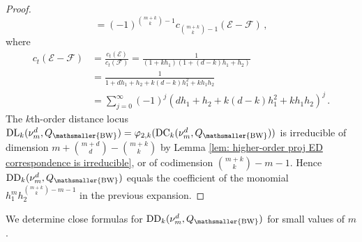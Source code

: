 \documentclass[11pt,reqno]{amsart}
\numberwithin{equation}{section}
\theoremstyle{plain}
\numberwithin{theorem}{section}
\theoremstyle{definition}
\newcommand{\EE}{\mathcal{E}}
\newcommand{\FF}{\mathcal{F}}
\newcommand{\DC}{\operatorname{DC}}
\newcommand{\DL}{\operatorname{DL}}
\newcommand{\DD}{\operatorname{DD}}
\newcommand{\mBW}{\mathsmaller{\mathrm{BW}}}
\begin{document}
\begin{proof}
\begin{equation}
= (-1)^{\binom{m+k}{k}-1}c_{\binom{m+k}{k}-1}(\EE-\FF)\,,
\end{equation}
where
\begin{align*}
c_t(\EE-\FF) &= \frac{c_t(\EE)}{c_t(\FF)} = \frac{1}{(1+kh_1)(1+(d-k)h_1+h_2)}\\
&= \frac{1}{1+dh_1+h_2+k(d-k)h_1^2+kh_1h_2}\\
&= \sum_{j=0}^\infty(-1)^j(dh_1+h_2+k(d-k)h_1^2+kh_1h_2)^j\,.
\end{align*}
The $k$th-order distance locus $\DL_k(\nu_m^d,Q_\mBW)=\varphi_{2,k}(\DC_k(\nu_m^d,Q_\mBW))$ is irreducible of dimension $m+\binom{m+d}{d}-\binom{m+k}{k}$ by Lemma \ref{lem: higher-order proj ED correspondence is irreducible}, or of codimension $\binom{m+k}{k}-m-1$. Hence $\DD_k(\nu_m^d,Q_\mBW)$ equals the coefficient of the monomial $h_1^mh_2^{\binom{m+k}{k}-m-1}$ in the previous expansion.
\end{proof}

We determine close formulas for $\DD_k(\nu_m^d,Q_\mBW)$ for small values of $m$.
\end{document}
